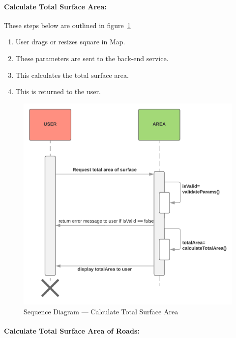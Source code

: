 \documentclass[a4paper,11pt]{article}
\begin{document}
\paragraph{Calculate Total Surface Area:}

These steps below are outlined in figure~\ref{fig:seq-total-area}

\begin{enumerate}
  \item User drags or resizes square in Map.
  \item These parameters are sent to the back-end service.
  \item This calculates the total surface area.
  \item This is returned to the user.
\end{enumerate}

\begin{figure}[H]
  \includegraphics[width=\textwidth]{sequence-diagram-calculate-total-surface-area}
  \caption{Sequence Diagram --- Calculate Total Surface
  Area}\label{fig:seq-total-area}
\end{figure}

\paragraph{Calculate Total Surface Area of Roads:}
\end{document}
